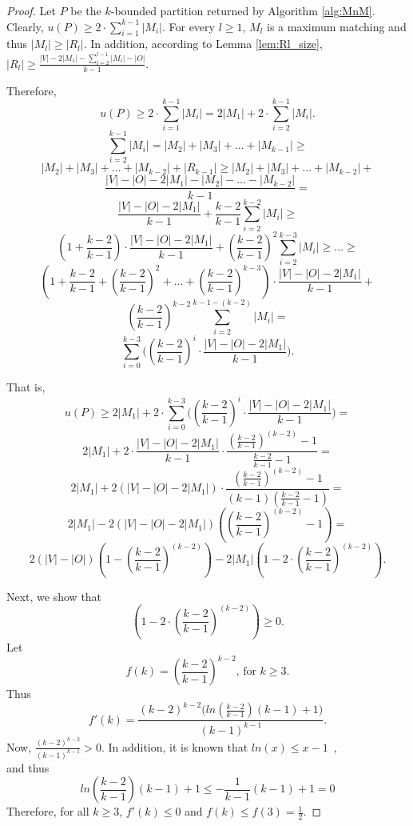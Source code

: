 \documentclass[sigconf,anonymous]{aamas}
\begin{document}
\begin{proof}
Let $P$ be the $k$-bounded partition returned by Algorithm \ref{alg:MnM}.
Clearly, $u(P) \geq 2\cdot\sum\limits_{i=1}^{k-1} |M_i|$.
For every $l\geq 1$, $M_l$ is a maximum matching and thus $|M_l| \geq |R_l|$. In addition, according to Lemma \ref{lem:Rl_size}, $|R_l| \geq \frac{|V|-2|M_1|-\sum\limits_{i=2}^{l-1} |M_i| - |O|}{k-1}$. 

Therefore, \[u(P) \geq 2\cdot\sum\limits_{i=1}^{k-1} |M_i| = 2|M_1| + 2\cdot \sum\limits_{i=2}^{k-1} |M_i|.\]
\[\sum\limits_{i=2}^{k-1} |M_i| = |M_2| + |M_3| + ... + |M_{k-1}| \geq\] \[|M_2| + |M_3| + ... + |M_{k-2}| + |R_{k-1}| \geq |M_2| + |M_3| + ... + |M_{k-2}| + \]\[\frac{|V| - |O| - 2|M_1| - |M_2| - ... - |M_{k-2}|}{k-1} =\] \[\frac{|V| - |O| - 2|M_1|}{k-1} + \frac{k-2}{k-1} \sum\limits_{i=2}^{k-2} |M_i| \geq\] \[ (1 + \frac{k-2}{k-1}) \cdot \frac{|V| - |O| - 2|M_1|}{k-1} + (\frac{k-2}{k-1})^2 \sum\limits_{i=2}^{k-3} |M_i| \geq ... \geq \]\[(1 + \frac{k-2}{k-1} + (\frac{k-2}{k-1})^2 + ... + (\frac{k-2}{k-1})^{k-3}) \cdot \frac{|V| - |O| - 2|M_1|}{k-1} + \]\[(\frac{k-2}{k-1})^{k-2} \sum\limits_{i=2}^{k-1-(k-2)} |M_i| =\]\[ \sum\limits_{i=0}^{k-3}\Big((\frac{k-2}{k-1})^i \cdot \frac{|V| - |O| - 2|M_1|}{k-1}\Big).\]

That is, \[u(P) \geq 2|M_1| + 2\cdot\sum\limits_{i=0}^{k-3}\Big((\frac{k-2}{k-1})^i \cdot \frac{|V| - |O| - 2|M_1|}{k-1}\Big) =\]
%
%
%
%
\[2|M_1| + 2\cdot\frac{|V|-|O|-2|M_1|}{k-1} \cdot \frac{(\frac{k-2}{k-1})^{(k-2)}-1}{\frac{k-2}{k-1} -1} =\] \[2|M_1| + 2(|V|-|O|-2|M_1|) \cdot \frac{(\frac{k-2}{k-1})^{(k-2)}-1}{(k-1)(\frac{k-2}{k-1} -1)} = \]\[ 2|M_1| - 2(|V|-|O|-2|M_1|)((\frac{k-2}{k-1})^{(k-2)}-1) = \]\[2(|V| - |O|)(1 - (\frac{k-2}{k-1})^{(k-2)}) - 2|M_1|(1 - 2 \cdot (\frac{k-2}{k-1})^{(k-2)}).\]

Next, we show that \[(1 - 2 \cdot (\frac{k-2}{k-1})^{(k-2)})\geq 0.\]
Let \[f(k) = (\frac{k-2}{k-1})^{k-2} \mbox{, for } k\geq 3.\] Thus \[f'(k) = \frac{(k-2)^{k-2}\big(ln(\frac{k-2}{k-1})(k-1) + 1\big)}{(k-1)^{k-1}}.\] 
Now, $\frac{(k-2)^{k-2}}{(k-1)^{k-1}} > 0$.
In addition, it is known that $ln(x) \leq x-1$~\cite{10.2307/3615890}, \\and thus \[ln(\frac{k-2}{k-1})(k-1) + 1 \leq -\frac{1}{k-1}(k-1) + 1 = 0\] Therefore, for all $k\geq3$, $f'(k) \leq 0$ and $f(k) \leq f(3) = \frac{1}{2}$.



\end{proof}
\end{document}
